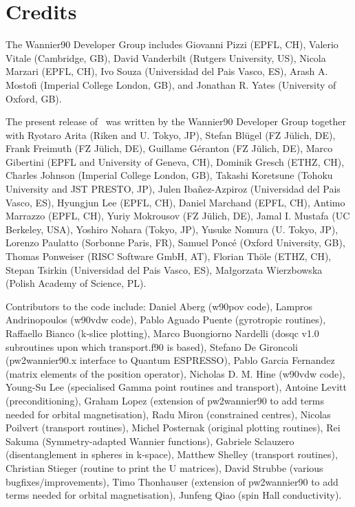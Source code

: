 \section*{Credits}
The Wannier90 Developer Group includes Giovanni Pizzi (EPFL, CH), 
Valerio Vitale (Cambridge, GB),
David Vanderbilt  (Rutgers University, US),
Nicola Marzari    (EPFL, CH),
Ivo Souza         (Universidad del Pais Vasco, ES),
Arash A. Mostofi  (Imperial College London, GB), and 
Jonathan R. Yates (University of Oxford, GB).

The present release of \wannier\ was written by the Wannier90 Developer Group together
with Ryotaro Arita (Riken and U. Tokyo, JP),
Stefan Bl\"ugel (FZ  J\"ulich, DE),
Frank Freimuth (FZ  J\"ulich, DE),
Guillame G\'eranton (FZ  J\"ulich, DE),
Marco Gibertini (EPFL and University of Geneva, CH),
Dominik Gresch (ETHZ, CH),
Charles Johnson (Imperial College London, GB),
Takashi Koretsune (Tohoku University and JST PRESTO, JP),
Julen Iba\~nez-Azpiroz (Universidad del Pais Vasco, ES),
Hyungjun Lee (EPFL, CH),
Daniel Marchand (EPFL, CH),
Antimo Marrazzo (EPFL, CH),
Yuriy Mokrousov (FZ  J\"ulich, DE),
Jamal I. Mustafa (UC Berkeley, USA),
Yoshiro Nohara (Tokyo, JP),
Yusuke Nomura (U. Tokyo, JP),
Lorenzo Paulatto (Sorbonne Paris, FR),
Samuel Ponc\'e (Oxford University, GB),
Thomas Ponweiser (RISC Software GmbH, AT),
Florian Th\"ole (ETHZ, CH),
Stepan Tsirkin (Universidad del Pais Vasco, ES),
Ma\l{}gorzata Wierzbowska (Polish Academy of Science, PL).

Contributors to the code include:
Daniel Aberg (w90pov code), 
Lampros Andrinopoulos (w90vdw code),
Pablo Aguado Puente (gyrotropic routines),
Raffaello Bianco (k-slice plotting),
Marco Buongiorno Nardelli (dosqc v1.0 subroutines upon which transport.f90 is based),
Stefano De Gironcoli (pw2wannier90.x interface to Quantum ESPRESSO),
Pablo Garcia Fernandez (matrix elements of the position operator),
Nicholas D. M. Hine (w90vdw code),
Young-Su Lee (specialised Gamma point routines and transport),
Antoine Levitt (preconditioning),
Graham Lopez (extension of pw2wannier90 to add terms needed for orbital magnetisation),
Radu Miron (constrained centres),
Nicolas Poilvert (transport routines),
Michel Posternak (original plotting routines),
Rei Sakuma (Symmetry-adapted Wannier functions),
Gabriele Sclauzero (disentanglement in spheres in k-space),
Matthew Shelley (transport routines),
Christian Stieger (routine to print the U matrices),
David Strubbe (various bugfixes/improvements),
Timo Thonhauser (extension of pw2wannier90 to add terms needed for orbital magnetisation), Junfeng Qiao (spin Hall conductivity).

